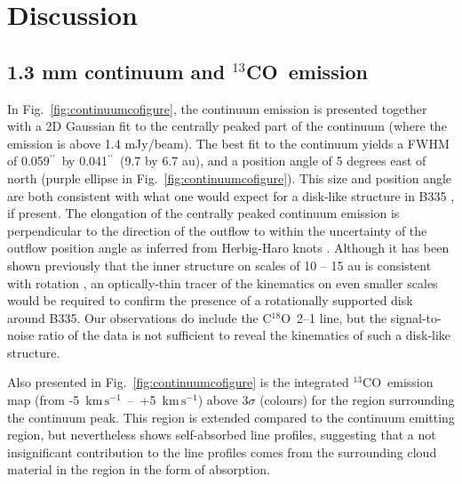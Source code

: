\documentclass{aa}
\newcommand{\kmpers}{\ensuremath{\mathrm{km \, s^{-1}}}\xspace} %
\newcommand{\trettenco}{$^{13}$CO\xspace}
\newcommand{\catteno}{C$^{18}$O\xspace}
\newcommand{\asec}{$^{\prime \prime}$}
\newcommand{\adeg}{$^{\circ}$}
\begin{document}
\section{Discussion}
\label{sec:discuss}
\subsection{1.3 mm continuum and \trettenco\ emission}
\label{sub:emission}
In Fig.~\ref{fig:continuumcofigure}, the continuum emission is presented together with a 2D Gaussian fit to the centrally peaked part of the continuum (where the emission is above 1.4 mJy/beam). The best fit to the continuum yields a FWHM of 0.059\asec\ by 0.041\asec\ (9.7 by 6.7 au), and a position angle of 5 degrees east of north (purple ellipse in Fig.~\ref{fig:continuumcofigure}). This size and position angle are both consistent with what one would expect for a disk-like structure in B335 \citep{Yen:2015vf,Bjerkeli:2019ip}, if present. The elongation of the centrally peaked continuum emission is perpendicular to the direction of the outflow to within the uncertainty of the outflow position angle as inferred from Herbig-Haro knots \citep[$\sim 80$ \adeg $\pm 10$ \adeg E of N, see e.g.][]{Galfalk:2007lr}. Although it has been shown previously that the inner structure on scales of 10 -- 15 au is consistent with rotation \citep{Yen:2015vf,Bjerkeli:2019ip}, an optically-thin tracer of the kinematics on even smaller scales would be required to confirm the presence of a rotationally supported disk around B335. Our observations do include the \catteno\ 2--1 line, but the signal-to-noise ratio of the data is not sufficient to reveal the kinematics of such a disk-like structure.

Also presented in Fig.~\ref{fig:continuumcofigure} is the integrated \trettenco\ emission map (from -5~\kmpers~--~+5~\kmpers) above 3$\sigma$ (colours) for the region surrounding the continuum peak. This region is extended compared to the continuum emitting region, but nevertheless shows self-absorbed line profiles, suggesting that a not insignificant contribution to the line profiles comes from the surrounding cloud material in the region in the form of absorption.
\end{document}
